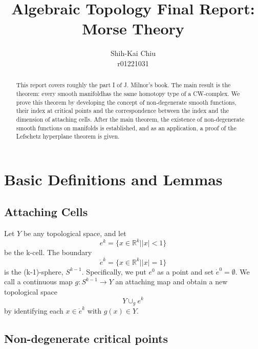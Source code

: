 \documentclass[a4paper,11pt,reqno]{amsart}
\newcommand{\RR}{\mathbb{R}}      %
\begin{document}
\nocite{*}

\title{Algebraic Topology Final Report: Morse Theory}

\author{Shih-Kai Chiu \\
r01221031}

\maketitle

\begin{abstract}
  This report covers roughly the part I of J. Milnor's book\cite{Mil}. The main
  result is the theorem: every smooth manifoldhas the same homotopy type of a
  CW-complex. We prove this theorem by developing the concept of non-degenerate
  smooth functions, their index at critical points and the correspondence
  between the index and the dimension of attaching cells. After the main
  theorem, the existence of non-degenerate smooth functions on manifolds is
  established, and as an application, a proof of the Lefschetz hyperplane
  theorem is given.
\end{abstract}


\section{Basic Definitions and Lemmas}


\subsection{Attaching Cells}

Let $Y$ be any topological space, and let
\begin{equation}
  e^k = \{ x \in \RR^k | \left| x \right| < 1 \}
\end{equation}
be the k-cell. The boundary
\begin{equation}
  \dot{e}^k = \{ x \in \RR^k | \left| x \right| = 1 \}
\end{equation}
is the (k-1)-sphere, $S^{k-1}$. Specifically, we put $e^0$ as a point and set
$\dot{e}^0 = \emptyset$. We call a continuous map $g: S^{k-1} \to Y$ an
attaching map and obtain a new topological space
\begin{equation}
  Y \cup_g e^k
\end{equation}
by identifying each $x \in \dot{e}^k$ with $g(x) \in Y$.


\subsection{Non-degenerate critical points}
\end{document}

